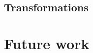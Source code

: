 \documentclass[conference]{IEEEtran}
\begin{document}
\subsection{Transformations}

\section{Future work}


%
%



%
%
\end{document}
